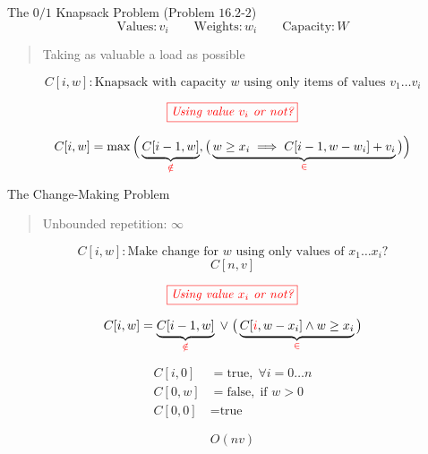\begin{frame}{}
  \begin{exampleblock}{The $0/1$ Knapsack Problem (Problem $16.2$-$2$)}
    \[
      \text{Values}: v_{i}  \qquad \text{Weights}: w_{i}  \qquad \text{Capacity}: W
    \]

    \begin{quote}
      \centering
      Taking as valuable a load as possible
    \end{quote}
  \end{exampleblock}

  \pause
  \[
    C[i, w]: \text{Knapsack with capacity $w$ using only items of values $v_{1} \dots v_{i}$}
  \]

  \[
    \textcolor{red}{\fbox{\it Using value $v_{i}$ or not?}}
  \]

  \[
    C[i,w] = \max \Big(\underbrace{C[i-1, w]}_{\textcolor{red}{\notin}}, \big(\underbrace{w \ge x_{i} \implies C[i-1, w-w_{i}] + v_{i}}_{\textcolor{red}{\in}}\big) \Big)
  \]
\end{frame}

\begin{frame}{}
  \begin{exampleblock}{The Change-Making Problem}
    \begin{quote}
      \centering
      Unbounded repetition: $\infty$
    \end{quote}
  \end{exampleblock}

  \pause
  \[
    C[i, w]: \text{Make change for $w$ using only values of $x_{1} \dots x_{i}$?}
  \]
  \[
    C[n,v]
  \]

  \pause
  \[
    \textcolor{red}{\fbox{\it Using value $x_{i}$ or not?}}
  \]

  \pause
  \[
    C[i,w] = \underbrace{C[i-1, w]}_{\textcolor{red}{\notin}} \;\lor\; \big(\underbrace{C[\textcolor{red}{i}, w-x_{i}] \land w \ge x_{i}}_{\textcolor{red}{\in}}\big)
  \]

  \pause
  \begin{align*}
    C[i,0] &= \text{true}, \; \forall i = 0 \dots n  \\
    C[0,w] &= \text{false}, \; \text{if } w > 0 \\
    C[0,0] &= \text{true}
  \end{align*}
  
  \[
    O(nv)
  \]
\end{frame}

